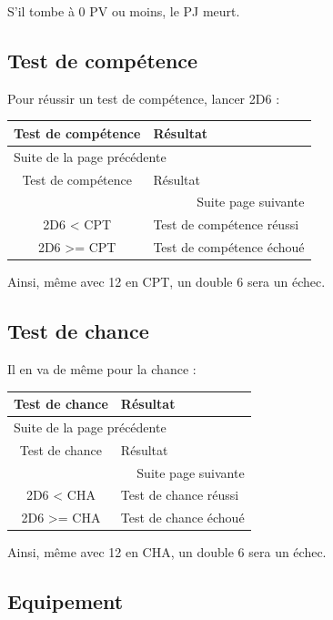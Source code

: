 \documentclass[a4paper, 11pt, twoside]{article}
\begin{document}
S'il tombe à 0 PV ou moins, le PJ meurt.

\subsection{Test de compétence}
\label{sec:org06b3f35}

Pour réussir un test de compétence, lancer 2D6 :

\begin{longtable}{c|l}
Test de compétence & Résultat\\
\hline
\endfirsthead
\multicolumn{2}{l}{Suite de la page précédente} \\
\hline

Test de compétence & Résultat \\

\hline
\endhead
\hline\multicolumn{2}{r}{Suite page suivante} \\
\endfoot
\endlastfoot
\hline
2D6 < CPT & Test de compétence réussi\\
2D6 >= CPT & Test de compétence échoué\\
\end{longtable}

Ainsi, même avec 12 en CPT, un double 6 sera un échec.

\subsection{Test de chance}
\label{sec:org4a31d77}

Il en va de même pour la chance :

\begin{longtable}{c|l}
Test de chance & Résultat\\
\hline
\endfirsthead
\multicolumn{2}{l}{Suite de la page précédente} \\
\hline

Test de chance & Résultat \\

\hline
\endhead
\hline\multicolumn{2}{r}{Suite page suivante} \\
\endfoot
\endlastfoot
\hline
2D6 < CHA & Test de chance réussi\\
2D6 >= CHA & Test de chance échoué\\
\end{longtable}

Ainsi, même avec 12 en CHA, un double 6 sera un échec.

\subsection{Equipement}
\label{sec:org4f6e34b}
\end{document}
